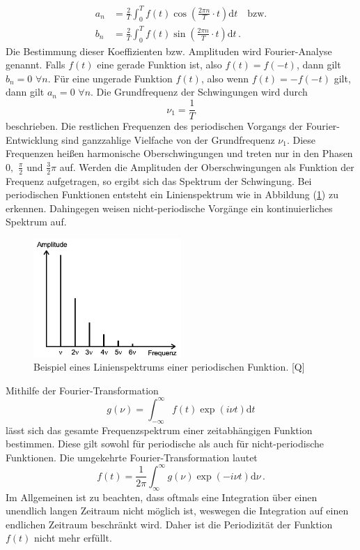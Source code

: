 \begin{align}
    a_n &= \frac{2}{T} \int_{0}^{T}f(t)\cos \left( \frac{2\pi n}{T}\cdot t\right)\text{d}t\quad \text{bzw.} \label{eqn:a_n}\\
    b_n &= \frac{2}{T} \int_{0}^{T}f(t)\sin \left( \frac{2\pi n}{T}\cdot t\right)\text{d}t\,.\label{eqn:b_n}
\end{align}
Die Bestimmung dieser Koeffizienten bzw. Amplituden wird Fourier-Analyse genannt. Falls $f(t)$ eine gerade Funktion ist, also $f(t)=f(-t)$, dann 
gilt $b_n = 0\,\,\forall n$. Für eine ungerade Funktion $f(t)$, also wenn $f(t) = -f(-t)$ gilt, dann gilt $a_n= 0\,\,\forall n$.
Die Grundfrequenz der Schwingungen wird durch
\begin{equation}
    \nu_1=\frac{1}{T}
    \label{eqn:Grundfrequenz}
\end{equation}
beschrieben. Die restlichen Frequenzen des periodischen Vorgangs der Fourier-Entwicklung sind ganzzahlige Vielfache von
der Grundfrequenz $\nu_1$. Diese Frequenzen heißen harmonische Oberschwingungen und treten nur in den Phasen $0,\,\, \frac{\pi}{2}$ und $\frac{3}{2}\pi$
auf. Werden die Amplituden der Oberschwingungen als Funktion der Frequenz aufgetragen, so ergibt sich das Spektrum der Schwingung. Bei periodischen
Funktionen entsteht ein Linienspektrum wie in Abbildung (\ref{fig:Linienspektrum}) zu erkennen. Dahingegen weisen nicht-periodische Vorgänge ein
kontinuierliches Spektrum auf.
\begin{figure}[H]
    \centering
    \includegraphics[width=0.50\textwidth]{Linienspektrum.png}
    \caption{Beispiel eines Linienspektrums einer periodischen Funktion. [Q\cite{anleitungV351}]}
    \label{fig:Linienspektrum}
\end{figure}
Mithilfe der Fourier-Transformation
\begin{equation}
    g(\nu)= \int_{-\infty}^{\infty}f(t)\exp\left(i \nu t\right) \text{d}t
    \label{eqn:FourierTransformation}
\end{equation}
lässt sich das gesamte Frequenzspektrum einer zeitabhängigen Funktion bestimmen. Diese gilt sowohl für periodische als auch für 
nicht-periodische Funktionen. Die umgekehrte Fourier-Transformation lautet
\begin{equation}
    f(t)=\frac{1}{2\pi}\int_{\infty}^{\infty}g(\nu)\exp\left(-i\nu t\right)\text{d}\nu\,.
    \label{eqn:reverseFourierTransformation}
\end{equation}
Im Allgemeinen ist zu beachten, dass oftmals eine Integration über einen unendlich langen Zeitraum nicht möglich ist, weswegen die Integration auf einen endlichen
Zeitraum beschränkt wird. Daher ist die Periodizität der Funktion $f(t)$ nicht mehr erfüllt.
